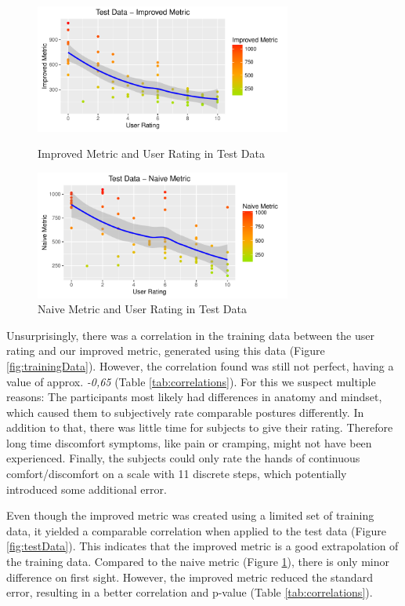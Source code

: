 \documentclass{sig-alternate-05-2015}
\begin{document}
\begin{figure}[t]
\centering
\includegraphics[width=8.45cm]{TestDataImproved}
\vspace{-20pt}
\caption{Improved Metric and User Rating in Test Data}
\label{fig:testData}

\includegraphics[width=8.45cm]{TestDataNaive}
\vspace{-20pt}
\caption{Naive Metric and User Rating in Test Data}
\label{fig:testDataNaive}
\vspace{-10pt}
\end{figure}


Unsurprisingly, there was a correlation in the training data between the user rating and our improved metric, generated using this data (Figure \ref{fig:trainingData}). However, the correlation found was still not perfect, having a value of approx. \textsl{-0,65} (Table \ref{tab:correlations}). For this we suspect multiple reasons: 
The participants most likely had differences in anatomy and mindset, which caused them to subjectively rate comparable postures differently. In addition to that, there was little time for subjects to give their rating. Therefore long time discomfort symptoms, like pain or cramping, might not have been experienced. Finally, the subjects could only rate the hands of continuous comfort/discomfort on a scale with 11 discrete steps, which potentially introduced some additional error.

Even though the improved metric was created using a limited set of training data, it yielded a comparable correlation when applied to the test data (Figure \ref{fig:testData}). This indicates that the improved metric is a good extrapolation of the training data. Compared to the naive metric (Figure \ref{fig:testDataNaive}), there is only minor difference on first sight. However, the improved metric reduced the standard error, resulting in a better correlation and p-value (Table \ref{tab:correlations}).
\end{document}
